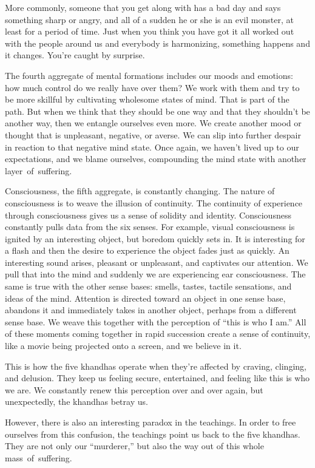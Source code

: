 More commonly, someone that you get along with has a bad day and says something sharp or angry, and all of a sudden he or she is an evil monster, at least for a period of time. Just when you think you have got it all worked out with the people around us and everybody is harmonizing, something happens and it changes. You're caught by surprise.

The fourth aggregate of mental formations includes our moods and emotions: how much control do we really have over them? We work with them and try to be more skillful by cultivating wholesome states of mind. That is part of the path. But when we think that they should be one way and that they shouldn't be another way, then we entangle ourselves even more. We create another mood or thought that is unpleasant, negative, or averse. We can slip into further despair in reaction to that negative mind state. Once again, we haven't lived up to our expectations, and we blame ourselves, compounding the mind state with another \mbox{layer of suffering.}

Consciousness, the fifth aggregate, is constantly changing. The nature of consciousness is to weave the illusion of continuity. The continuity of experience through consciousness gives us a sense of solidity and identity. Consciousness constantly pulls data from the six senses. For example, visual consciousness is ignited by an interesting object, but boredom quickly sets in. It is interesting for a flash and then the desire to experience the object fades just as quickly. An interesting sound arises, pleasant or unpleasant, and captivates our attention. We pull that into the mind and suddenly we are experiencing ear \mbox{consciousness}. The same is true with the other sense bases: smells, tastes, tactile sensations, and ideas of the mind. Attention is directed toward an object in one sense base, abandons it and immediately takes in another object, perhaps from a different sense base. We weave this together with the perception of ``this is who I am.'' All of these moments coming together in rapid succession create a sense of continuity, like a movie being projected onto a screen, and we believe in it.

This is how the five khandhas operate when they're affected by craving, clinging, and delusion. They keep us feeling secure, entertained, and feeling like this is who we are. We constantly renew this perception over and over again, but unexpectedly, the khandhas betray us.

However, there is also an interesting paradox in the teachings. In order to free ourselves from this confusion, the teachings point us back to the five khandhas. They are not only our ``murderer,'' but also the way out of this whole \mbox{mass of suffering.}

